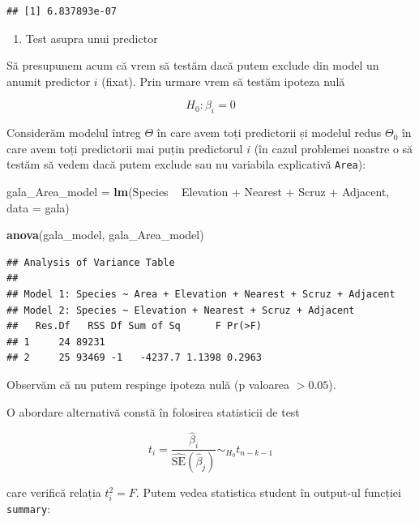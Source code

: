 \documentclass[]{article}
\newenvironment{Shaded}{\begin{snugshade}}{\end{snugshade}}
\newcommand{\KeywordTok}[1]{\textcolor[rgb]{0.13,0.29,0.53}{\textbf{{#1}}}}
\newcommand{\DataTypeTok}[1]{\textcolor[rgb]{0.13,0.29,0.53}{{#1}}}
\newcommand{\StringTok}[1]{\textcolor[rgb]{0.31,0.60,0.02}{{#1}}}
\newcommand{\NormalTok}[1]{{#1}}
\providecommand{\tightlist}{%
  \setlength{\itemsep}{0pt}\setlength{\parskip}{0pt}}
\begin{document}
\begin{verbatim}
## [1] 6.837893e-07
\end{verbatim}

\begin{enumerate}
\def\labelenumi{\alph{enumi})}
\setcounter{enumi}{1}
\tightlist
\item
  Test asupra unui predictor
\end{enumerate}

Să presupunem acum că vrem să testăm dacă putem exclude din model un
anumit predictor \(i\) (fixat). Prin urmare vrem să testăm ipoteza nulă

\[
H_0:\beta_i=0
\]

Considerăm modelul întreg \(\Theta\) în care avem toți predictorii și
modelul redus \(\Theta_0\) în care avem toți predictorii mai puțin
predictorul \(i\) (în cazul problemei noastre o să testăm să vedem dacă
putem exclude sau nu variabila explicativă \texttt{Area}):

\begin{Shaded}
\begin{Highlighting}[]
\NormalTok{gala_Area_model =}\StringTok{ }\KeywordTok{lm}\NormalTok{(Species ~}\StringTok{ }\NormalTok{Elevation +}\StringTok{ }\NormalTok{Nearest +}\StringTok{ }\NormalTok{Scruz +}\StringTok{ }\NormalTok{Adjacent, }
    \DataTypeTok{data =} \NormalTok{gala)}

\KeywordTok{anova}\NormalTok{(gala_model, gala_Area_model)}
\end{Highlighting}
\end{Shaded}

\begin{verbatim}
## Analysis of Variance Table
## 
## Model 1: Species ~ Area + Elevation + Nearest + Scruz + Adjacent
## Model 2: Species ~ Elevation + Nearest + Scruz + Adjacent
##   Res.Df   RSS Df Sum of Sq      F Pr(>F)
## 1     24 89231                           
## 2     25 93469 -1   -4237.7 1.1398 0.2963
\end{verbatim}

Observăm că nu putem respinge ipoteza nulă (p valoarea \(>0.05\)).

O abordare alternativă constă în folosirea statisticii de test

\[
t_i = \frac{\hat\beta_i}{\hat{\mathrm{SE}}(\hat\beta_j)}\sim_{H_0} t_{n-k-1}
\]

care verifică relația \(t_i^2 = F\). Putem vedea statistica student în
output-ul funcției \texttt{summary}:

\begin{Shaded}
\end{Shaded}
\end{document}
